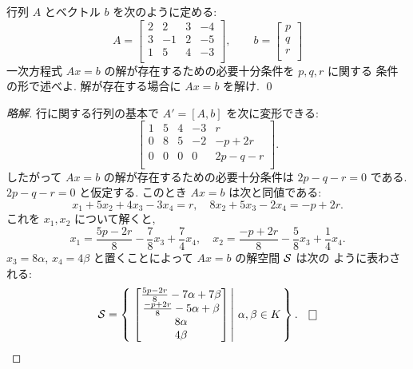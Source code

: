 \documentclass[12pt,twoside]{jarticle}
\newcommand\commentout[1]{#1}
\newcommand\commentout[1]{}
\begin{document}
\begin{question}
  \label{q:sol-inhom-2}
  行列 $A$ とベクトル $b$ を次のように定める:
  \begin{equation*}
    A = 
    \begin{bmatrix}
      2 &  2 & 3 & -4 \\
      3 & -1 & 2 & -5 \\
      1 &  5 & 4 & -3 \\
    \end{bmatrix},
    \qquad
    b =
    \begin{bmatrix}
      p \\
      q \\
      r \\
    \end{bmatrix}
  \end{equation*}
  一次方程式 $Ax=b$ の解が存在するための必要十分条件を $p,q,r$ に関する
  条件の形で述べよ.  解が存在する場合に $Ax=b$ を解け. \qed
\end{question}

\commentout{
\begin{proof}[略解]
  行に関する行列の基本で $A'=[A,b]$ を次に変形できる:
  \begin{equation*}
    \left[
      \begin{array}{cccc|c}
        1 & 5 & 4 & -3 &          r \\
        0 & 8 & 5 & -2 & -p     +2r \\
        0 & 0 & 0 &  0 & 2p - q - r \\
      \end{array}
    \right].
  \end{equation*}
  したがって $Ax=b$ の解が存在するための必要十分条件は $2p-q-r=0$ である.
  $2p-q-r=0$ と仮定する. このとき $Ax=b$ は次と同値である:
  \begin{equation*}
    x_1 + 5x_2 + 4x_3 -3x_4 = r,
    \quad
          8x_2 + 5x_3 -2x_4 = -p+2r.
  \end{equation*}
  これを $x_1,x_2$ について解くと,
  \begin{equation*}
    x_1 = \frac{5p-2r}{8} - \frac{7}{8}x_3 + \frac{7}{4}x_4,
    \quad
    x_2 = \frac{-p+2r}{8} - \frac{5}{8}x_3 + \frac{1}{4}x_4.
  \end{equation*}
  $x_3=8\alpha$, $x_4=4\beta$ と置くことによって $Ax=b$ の解空間 ${\mathcal S}$ は次の
  ように表わされる:
  \begin{equation*}
    \cS =
    \left\{\,
      \left.
        \begin{bmatrix}
          \frac{5p-2r}{8} - 7\alpha + 7\beta \\
          \frac{-p+2r}{8} - 5\alpha +  \beta \\
          8\alpha \\
          4\beta \\
        \end{bmatrix}
      \,\right|\,
      \alpha,\beta\in K
    \,\right\}.
    \qed
  \end{equation*}
\end{proof}
}
\end{document}
